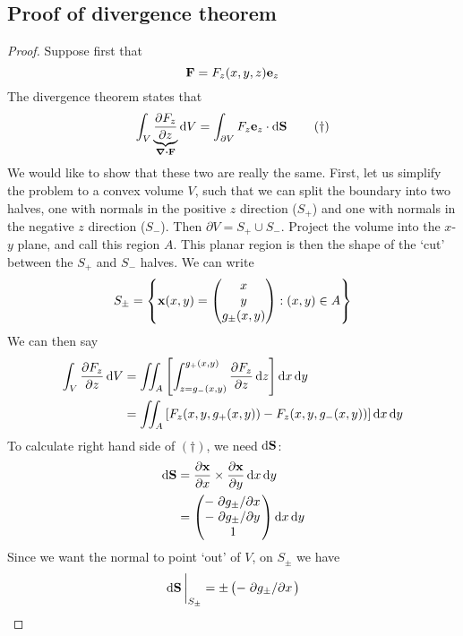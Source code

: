 \subsection{Proof of divergence theorem}
\begin{proof}
	Suppose first that
	\[
		\vb F = F_z(x,y,z) \vb e_z
	\]
	The divergence theorem states that
	\begin{equation}
		\int_V \underbrace{\pdv{F_z}{z}}_{\div{\vb F}} \dd{V} = \int_{\partial V} F_z \vb e_z \cdot \dd{\vb S}
		\tag{\(\dagger\)}
	\end{equation}
	We would like to show that these two are really the same.
	First, let us simplify the problem to a convex volume \(V\), such that we can split the boundary into two halves, one with normals in the positive \(z\) direction (\(S_+\)) and one with normals in the negative \(z\) direction (\(S_-\)).
	Then \(\partial V = S_+ \cup S_-\).
	Project the volume into the \(x\)-\(y\) plane, and call this region \(A\).
	This planar region is then the shape of the `cut' between the \(S_+\) and \(S_-\) halves.
	We can write
	\[
		S_\pm = \left\{ \vb x(x, y) = \begin{pmatrix}
			x \\ y \\ g_\pm (x, y)
		\end{pmatrix} : (x, y) \in A \right\}
	\]
	We can then say
	\begin{align*}
		\int_V \pdv{F_z}{z} \dd{V} & = \iint_{A} \left[ \int_{z = g_- (x, y)}^{g_+ (x, y)} \pdv{F_z}{z} \dd{z} \right] \dd{x} \dd{y} \\
		                           & = \iint_A \left[ F_z(x, y, g_+ (x, y)) - F_z(x, y, g_- (x, y)) \right] \dd{x}\dd{y}
	\end{align*}
	To calculate right hand side of \((\dagger)\), we need \(\dd{\vb S}\):
	\begin{align*}
		\dd{\vb S} & = \pdv{\vb x}{x} \times \pdv{\vb x}{y} \dd{x}\dd{y} \\
		           & = \begin{pmatrix}
			-\pdv*{g_\pm}{x} \\
			-\pdv*{g_\pm}{y} \\
			1                \\
		\end{pmatrix} \dd{x}\dd{y}
	\end{align*}
	Since we want the normal to point `out' of \(V\), on \(S_\pm\) we have
	\[
		\eval{\dd{\vb S}}_{S_\pm} = \pm \begin{pmatrix}
			-\pdv*{g_\pm}{x} \\

\end{pmatrix}\]
\end{proof}
